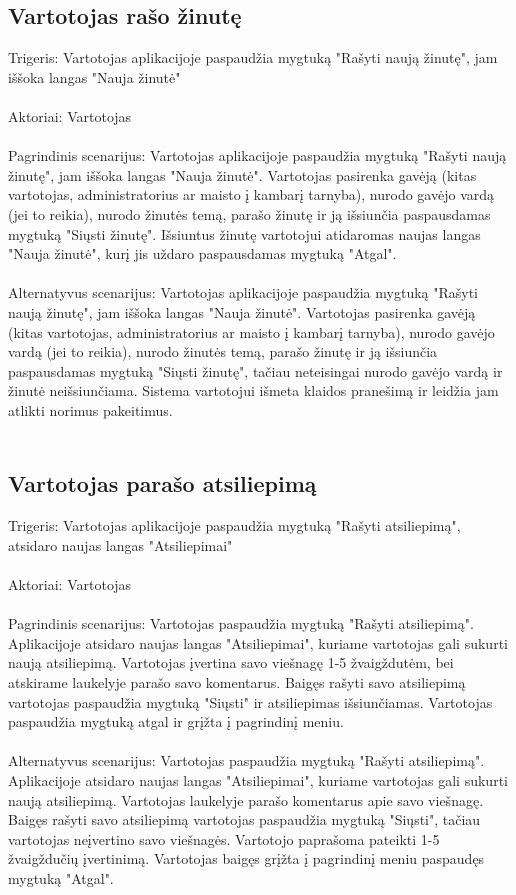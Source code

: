 \documentclass[oneside]{VUMIFPSkursinis}
\begin{document}
\subsection{Vartotojas rašo žinutę}
	Trigeris: Vartotojas aplikacijoje paspaudžia mygtuką "Rašyti naują žinutę", jam iššoka langas "Nauja žinutė" \\ \\
	Aktoriai: Vartotojas \\ \\
	Pagrindinis scenarijus: Vartotojas aplikacijoje paspaudžia mygtuką "Rašyti naują žinutę", jam iššoka langas "Nauja žinutė". Vartotojas pasirenka gavėją (kitas vartotojas, administratorius ar maisto į kambarį tarnyba), nurodo gavėjo vardą (jei to reikia), nurodo žinutės temą, parašo žinutę ir ją išsiunčia paspausdamas mygtuką "Siųsti žinutę". Išsiuntus žinutę vartotojui atidaromas naujas langas "Nauja žinutė", kurį jis uždaro paspausdamas mygtuką "Atgal". \\ \\
	Alternatyvus scenarijus: Vartotojas aplikacijoje paspaudžia mygtuką "Rašyti naują žinutę", jam iššoka langas "Nauja žinutė". Vartotojas pasirenka gavėją (kitas vartotojas, administratorius ar maisto į kambarį tarnyba), nurodo gavėjo vardą (jei to reikia), nurodo žinutės temą, parašo žinutę ir ją išsiunčia paspausdamas mygtuką "Siųsti žinutę", tačiau neteisingai nurodo gavėjo vardą ir žinutė neišsiunčiama. Sistema vartotojui išmeta klaidos pranešimą ir leidžia jam atlikti norimus pakeitimus. \\ \\

\subsection{Vartotojas parašo atsiliepimą}
	Trigeris: Vartotojas aplikacijoje paspaudžia mygtuką "Rašyti atsiliepimą", atsidaro naujas langas "Atsiliepimai" \\ \\
	Aktoriai: Vartotojas \\ \\
	Pagrindinis scenarijus: Vartotojas paspaudžia mygtuką "Rašyti atsiliepimą". Aplikacijoje atsidaro naujas langas "Atsiliepimai", kuriame vartotojas gali sukurti naują atsiliepimą. Vartotojas įvertina savo viešnagę 1-5 žvaigždutėm, bei atskirame laukelyje parašo savo komentarus. Baigęs rašyti savo atsiliepimą vartotojas paspaudžia mygtuką "Siųsti" ir atsiliepimas išsiunčiamas. Vartotojas paspaudžia mygtuką atgal ir grįžta į pagrindinį meniu. \\ \\
	Alternatyvus scenarijus: Vartotojas paspaudžia mygtuką "Rašyti atsiliepimą". Aplikacijoje atsidaro naujas langas "Atsiliepimai", kuriame vartotojas gali sukurti naują atsiliepimą. Vartotojas laukelyje parašo komentarus apie savo viešnagę. Baigęs rašyti savo atsiliepimą vartotojas paspaudžia mygtuką "Siųsti", tačiau vartotojas neįvertino savo viešnagės. Vartotojo paprašoma pateikti 1-5 žvaigždučių įvertinimą. Vartotojas baigęs grįžta į pagrindinį meniu paspaudęs mygtuką "Atgal". \\ \\
\end{document}
